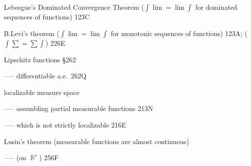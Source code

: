 Lebesgue's Dominated Convergence Theorem ($\int\lim=\lim\int$
for dominated sequences of functions) 123C

B.Levi's theorem ($\int\lim=\lim\int$
for monotonic sequences of functions) 123A;
  ($\int\sum=\sum\int$) 226E





















Lipschitz functions \S262

----- differentiable a.e.\ 262Q

localizable measure space

----- assembling partial measurable functions 213N

----- which is not strictly localizable 216E

























Lusin's theorem (measurable functions are almost
continuous)


----- (on $\BbbR^r$) 256F





\indexmedskip














































